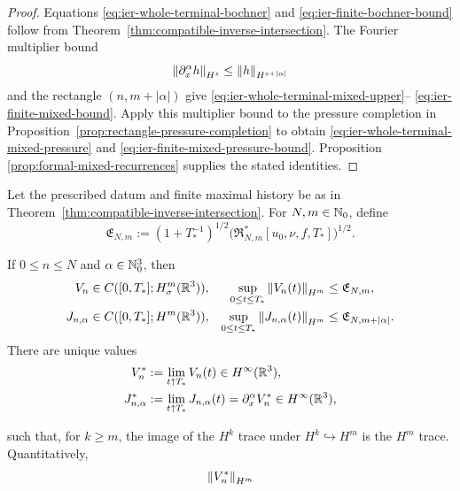 \begin{proof}
Equations \eqref{eq:ier-whole-terminal-bochner} and
\eqref{eq:ier-finite-bochner-bound} follow from
Theorem~\ref{thm:compatible-inverse-intersection}.  The Fourier multiplier
bound
\[
 \left\lVert \partial_x^\alpha h\right\rVert_{H^s}
 \le\left\lVert h\right\rVert_{H^{s+|\alpha|}}
\]
and the rectangle \((n,m+|\alpha|)\) give
\eqref{eq:ier-whole-terminal-mixed-upper}--%
\eqref{eq:ier-finite-mixed-bound}.  Apply this multiplier bound to the
pressure completion in Proposition~\ref{prop:rectangle-pressure-completion}
to obtain \eqref{eq:ier-whole-terminal-mixed-pressure} and
\eqref{eq:ier-finite-mixed-pressure-bound}.  Proposition
\ref{prop:formal-mixed-recurrences} supplies the stated identities.
\end{proof}

\begin{theorem}
\label{thm:ier-compatible-endpoint-traces}
Let the prescribed datum and finite maximal history be as in
Theorem~\ref{thm:compatible-inverse-intersection}.
For \(N,m\in\mathbb N_0\), define
\begin{equation}
 \mathfrak E_{N,m}
 :=(1+T_*^{-1})^{1/2}
 \bigl(\mathfrak R_{N,m}^*[u_0,\nu,f,T_*]\bigr)^{1/2}.
 \label{eq:ier-endpoint-majorant}
\end{equation}
\begin{samepage}
If \(0\le n\le N\) and \(\alpha\in\mathbb N_0^3\), then
\begin{align}
 V_n&\in C([0,T_*];H^m_\sigma(\mathbb R^3)),
 &\sup_{0\le t\le T_*}\left\lVert V_n(t)\right\rVert_{H^m}
 &\le\mathfrak E_{N,m},
 \label{eq:ier-row-trace}\\
 J_{n,\alpha}&\in C([0,T_*];H^m(\mathbb R^3)),
 &\sup_{0\le t\le T_*}\left\lVert J_{n,\alpha}(t)\right\rVert_{H^m}
 &\le\mathfrak E_{N,m+|\alpha|}.
 \label{eq:ier-mixed-row-trace}
\end{align}
There are unique values
\begin{align}
 V_n^*&:=\lim_{t\uparrow T_*}V_n(t)
 \in H^\infty(\mathbb R^3),
 \label{eq:ier-velocity-endpoint}\\
 J_{n,\alpha}^*&:=\lim_{t\uparrow T_*}J_{n,\alpha}(t)
 =\partial_x^\alpha V_n^*
 \in H^\infty(\mathbb R^3),
 \label{eq:ier-mixed-velocity-endpoint}
\end{align}
\par
\end{samepage}
such that, for \(k\ge m\), the image of the \(H^k\) trace under
\(H^k\hookrightarrow H^m\) is the \(H^m\) trace.  Quantitatively,
\begin{align}
 \norm{V_n^*}_{H^m}

\end{align}
\end{theorem}
